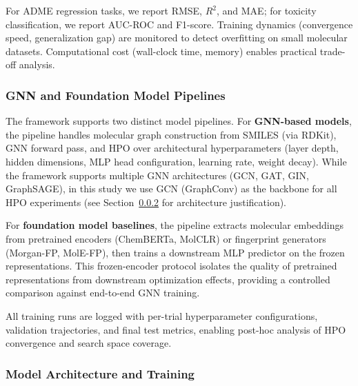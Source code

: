 \documentclass[12pt]{article}
\begin{document}
\noindent For ADME regression tasks, we report RMSE, $R^2$, and MAE; for toxicity classification, we report AUC-ROC and F1-score. Training dynamics (convergence speed, generalization gap) are monitored to detect overfitting on small molecular datasets. Computational cost (wall-clock time, memory) enables practical trade-off analysis.

\subsubsection{GNN and Foundation Model Pipelines}

The framework supports two distinct model pipelines. For \textbf{GNN-based models}, the pipeline handles molecular graph construction from SMILES (via RDKit), GNN forward pass, and HPO over architectural hyperparameters (layer depth, hidden dimensions, MLP head configuration, learning rate, weight decay). While the framework supports multiple GNN architectures (GCN, GAT, GIN, GraphSAGE), in this study we use GCN (GraphConv) as the backbone for all HPO experiments (see Section~\ref{sec:model_arch} for architecture justification).

For \textbf{foundation model baselines}, the pipeline extracts molecular embeddings from pretrained encoders (ChemBERTa, MolCLR) or fingerprint generators (Morgan-FP, MolE-FP), then trains a downstream MLP predictor on the frozen representations. This frozen-encoder protocol isolates the quality of pretrained representations from downstream optimization effects, providing a controlled comparison against end-to-end GNN training.

All training runs are logged with per-trial hyperparameter configurations, validation trajectories, and final test metrics, enabling post-hoc analysis of HPO convergence and search space coverage.

\subsubsection{Model Architecture and Training}
\label{sec:model_arch}
\end{document}
